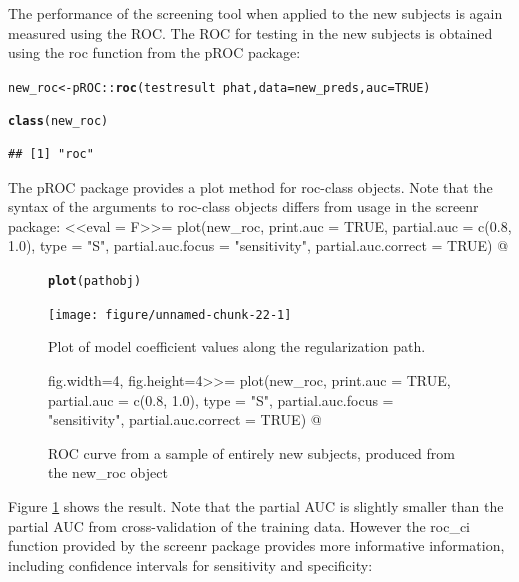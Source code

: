 \documentclass[11pt]{report}\usepackage[]{graphicx}\usepackage[]{xcolor}
\makeatletter
\newcommand{\hlnum}[1]{\textcolor[rgb]{0.686,0.059,0.569}{#1}}%
\newcommand{\hlopt}[1]{\textcolor[rgb]{0,0,0}{#1}}%
\newcommand{\hlstd}[1]{\textcolor[rgb]{0.345,0.345,0.345}{#1}}%
\newcommand{\hlkwb}[1]{\textcolor[rgb]{0.69,0.353,0.396}{#1}}%
\newcommand{\hlkwc}[1]{\textcolor[rgb]{0.333,0.667,0.333}{#1}}%
\newcommand{\hlkwd}[1]{\textcolor[rgb]{0.737,0.353,0.396}{\textbf{#1}}}%
\newenvironment{kframe}{%
 \def\at@end@of@kframe{}%
 \ifinner\ifhmode%
  \def\at@end@of@kframe{\end{minipage}}%
  \begin{minipage}{\columnwidth}%
 \fi\fi%
 \def\FrameCommand##1{\hskip\@totalleftmargin \hskip-\fboxsep
 \colorbox{shadecolor}{##1}\hskip-\fboxsep
     \hskip-\linewidth \hskip-\@totalleftmargin \hskip\columnwidth}%
 \MakeFramed {\advance\hsize-\width
   \@totalleftmargin\z@ \linewidth\hsize
   \@setminipage}}%
 {\par\unskip\endMakeFramed%
 \at@end@of@kframe}
\newenvironment{knitrout}{}{} %
\makeatother
\begin{document}
The performance of the screening tool when applied to the new subjects
is again measured using the ROC.  The ROC for testing in the new
subjects is obtained using the \textsf{roc} function from the \textsf{pROC} package:
\begin{knitrout}
\color{fgcolor}\begin{kframe}
\begin{alltt}
\hlstd{new_roc} \hlkwb{<-} \hlstd{pROC}\hlopt{::}\hlkwd{roc}\hlstd{(testresult} \hlopt{~} \hlstd{phat,} \hlkwc{data} \hlstd{= new_preds,} \hlkwc{auc} \hlstd{=} \hlnum{TRUE}\hlstd{)}
\end{alltt}


{\ttfamily\noindent\itshape\color{messagecolor}{\#\# Setting levels: control = 0, case = 1}}

{\ttfamily\noindent\itshape\color{messagecolor}{\#\# Setting direction: controls < cases}}\begin{alltt}
\hlkwd{class}\hlstd{(new_roc)}
\end{alltt}
\begin{verbatim}
## [1] "roc"
\end{verbatim}
\end{kframe}
\end{knitrout}

The \textsf{pROC} package provides a plot method for
\textsf{roc}-class objects. Note that the syntax of the arguments to
\textsf{roc}-class objects differs from usage in the \textsf{screenr}
package: <<eval = F>>= plot(new_roc, print.auc = TRUE, partial.auc =
c(0.8, 1.0), type = "S", partial.auc.focus = "sensitivity",
partial.auc.correct = TRUE) @ \begin{figure}[!h] \begin{center}
\begin{knitrout}
\color{fgcolor}\begin{kframe}
\begin{alltt}
\hlkwd{plot}\hlstd{(pathobj)}
\end{alltt}
\end{kframe}
\texttt{[image: figure/unnamed-chunk-22-1]} 
\end{knitrout}
\caption{Plot of model coefficient values along the regularization
  path.}
\label{fig:f1}fig.width=4, fig.height=4>>=
plot(new_roc, print.auc = TRUE, partial.auc =  c(0.8, 1.0), type = "S",
     partial.auc.focus = "sensitivity", partial.auc.correct = TRUE)
@
\caption{ROC curve from a sample of entirely new subjects, produced
  from the \textsf{new\_roc} object}
\label{fig:f3}
\end{center}
\end{figure}
Figure \ref{fig:f3} shows the result. Note that the partial AUC is slightly
smaller than the partial AUC from cross-validation of the training
data. However the \textsf{roc\_ci} function provided by the
\textsf{screenr} package provides more informative information,
including confidence intervals for sensitivity and specificity:
\end{document}
